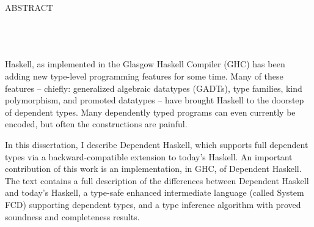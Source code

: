 \begin{doublespace}

\begin{centering}
{\Large ABSTRACT} \\
\Title \\
\Author \\
\Advisor \\
\end{centering}

\vspace*{1in}

Haskell, as implemented in the Glasgow Haskell Compiler (GHC) has been adding
new type-level programming features for some time. Many of these features --
chiefly: generalized algebraic datatypes (GADTs), type families, kind
polymorphism, and promoted datatypes -- have brought Haskell to the doorstep
of dependent types. Many dependently typed programs can even currently be
encoded, but often the constructions are painful.

In this dissertation, I describe Dependent Haskell, which supports full
dependent types via a backward-compatible extension to today's Haskell. An
important contribution of this work is an implementation, in GHC, of Dependent
Haskell. The text contains a full description of the differences between
Dependent Haskell and today's Haskell, a type-safe enhanced intermediate
language (called System FCD) supporting dependent types, and a type inference
algorithm with proved soundness and completeness results.

\end{doublespace}
